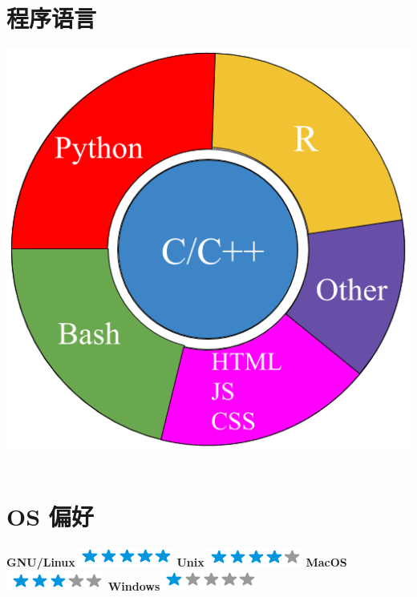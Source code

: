 \documentclass[]{friggeri-cv}
\begin{document}
\begin{aside}
    \section{程序语言}
    \includegraphics[scale=0.2]{img/programming.png}
    ~
    \section{OS 偏好}
    \textbf{GNU/Linux}\includegraphics[scale=0.40]{img/5stars.png}
    \textbf{Unix}\includegraphics[scale=0.40]{img/4stars.png}
    \textbf{MacOS}\includegraphics[scale=0.40]{img/3stars.png}
    \textbf{Windows}\includegraphics[scale=0.40]{img/1stars.png}
    ~
\end{aside}



\end{document}
